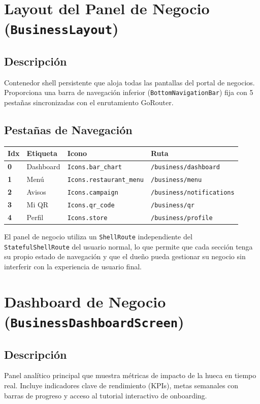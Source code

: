 \documentclass[11pt, a4paper, oneside]{report}
\begin{document}
\section{Layout del Panel de Negocio (\texttt{BusinessLayout})}

\subsection{Descripción}
Contenedor shell persistente que aloja todas las pantallas del portal de negocios. Proporciona una barra de navegación inferior (\texttt{BottomNavigationBar}) fija con 5 pestañas sincronizadas con el enrutamiento GoRouter.

\subsection{Pestañas de Navegación}
\begin{longtable}{>{\bfseries}p{1cm} p{3cm} p{3cm} p{6cm}}
\toprule
\textbf{Idx} & \textbf{Etiqueta} & \textbf{Icono} & \textbf{Ruta} \\
\midrule
0 & Dashboard & \texttt{Icons.bar\_chart} & \texttt{/business/dashboard} \\
1 & Menú & \texttt{Icons.restaurant\_menu} & \texttt{/business/menu} \\
2 & Avisos & \texttt{Icons.campaign} & \texttt{/business/notifications} \\
3 & Mi QR & \texttt{Icons.qr\_code} & \texttt{/business/qr} \\
4 & Perfil & \texttt{Icons.store} & \texttt{/business/profile} \\
\bottomrule
\end{longtable}

\begin{decisionbox}
El panel de negocio utiliza un \texttt{ShellRoute} independiente del \texttt{StatefulShellRoute} del usuario normal, lo que permite que cada sección tenga su propio estado de navegación y que el dueño pueda gestionar su negocio sin interferir con la experiencia de usuario final.
\end{decisionbox}

\section{Dashboard de Negocio (\texttt{BusinessDashboardScreen})}

\subsection{Descripción}
Panel analítico principal que muestra métricas de impacto de la hueca en tiempo real. Incluye indicadores clave de rendimiento (KPIs), metas semanales con barras de progreso y acceso al tutorial interactivo de onboarding.
\end{document}
